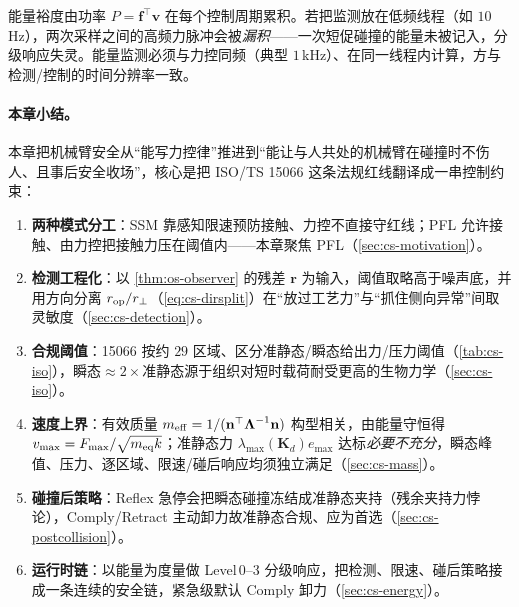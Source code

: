 \begin{pitfall}[能量监测的采样率不足]
能量裕度由功率 $P=\mathbf f^\top\mathbf v$ 在每个控制周期累积。若把监测放在低频线程（如 $10$\,Hz），两次采样之间的高频力脉冲会被\emph{漏积}——一次短促碰撞的能量未被记入，分级响应失灵。能量监测必须与力控同频（典型 $1$\,kHz）、在同一线程内计算，方与检测/控制的时间分辨率一致。
\end{pitfall}

\paragraph{本章小结。}
本章把机械臂安全从“能写力控律”推进到“能让与人共处的机械臂在碰撞时不伤人、且事后安全收场”，核心是把 ISO/TS 15066 这条法规红线翻译成一串控制约束：
\begin{enumerate}
  \item \textbf{两种模式分工}：SSM 靠感知限速预防接触、力控不直接守红线；PFL 允许接触、由力控把接触力压在阈值内——本章聚焦 PFL（\cref{sec:cs-motivation}）。
  \item \textbf{检测工程化}：以 \cref{thm:os-observer} 的残差 $\mathbf r$ 为输入，阈值取略高于噪声底，并用方向分离 $r_{\rm op}/r_\perp$（\cref{eq:cs-dirsplit}）在“放过工艺力”与“抓住侧向异常”间取灵敏度（\cref{sec:cs-detection}）。
  \item \textbf{合规阈值}：15066 按约 $29$ 区域、区分准静态/瞬态给出力/压力阈值（\cref{tab:cs-iso}），瞬态$\approx 2\times$准静态源于组织对短时载荷耐受更高的生物力学（\cref{sec:cs-iso}）。
  \item \textbf{速度上界}：有效质量 $m_{\rm eff}=1/(\mathbf n^\top\boldsymbol\Lambda^{-1}\mathbf n)$ 构型相关，由能量守恒得 $v_{\max}=F_{\max}/\sqrt{m_{\rm eq}k}$；准静态力 $\lambda_{\max}(\mathbf K_d)e_{\max}$ 达标\emph{必要不充分}，瞬态峰值、压力、逐区域、限速/碰后响应均须独立满足（\cref{sec:cs-mass}）。
  \item \textbf{碰撞后策略}：Reflex 急停会把瞬态碰撞冻结成准静态夹持（残余夹持力悖论），Comply/Retract 主动卸力故准静态合规、应为首选（\cref{sec:cs-postcollision}）。
  \item \textbf{运行时链}：以能量为度量做 Level\,0--3 分级响应，把检测、限速、碰后策略接成一条连续的安全链，紧急级默认 Comply 卸力（\cref{sec:cs-energy}）。
\end{enumerate}

